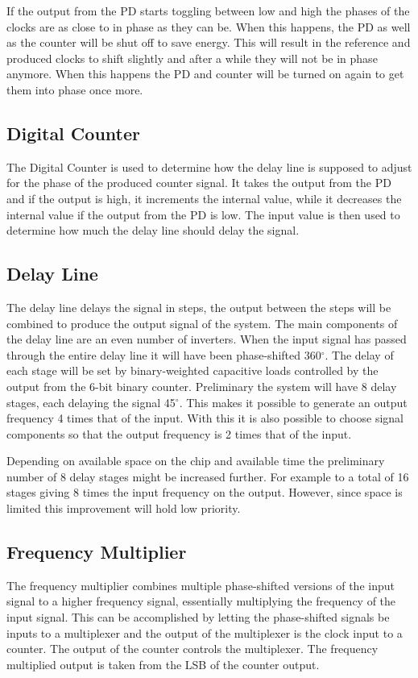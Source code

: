 \documentclass[a4paper,12pt]{article} \usepackage{graphicx}
\newcommand{\degree}{\ensuremath{^\circ}}
\begin{document}
If the output from the PD starts toggling between low and high the phases of 
the clocks are as close to in phase as they can be. When this happens, the PD 
as well as the counter will be shut off to save energy. This will result in 
the reference and produced clocks to shift slightly and after a while they will 
not be in phase anymore. When this happens the PD and counter will be turned 
on again to get them into phase once more.

\subsection{Digital Counter}
The Digital Counter is used to determine how the delay line is supposed to 
adjust for the phase of the produced counter signal. It takes the output from 
the PD and if the output is high, it increments the internal value, while it 
decreases the internal value if the output from the PD is low. The input value 
is then used to determine how much the delay line should delay the signal. 

\subsection{Delay Line}

The delay line delays the signal in steps, the output between the steps will be
combined to produce the output signal of the system. The main components
of the delay line are an even number of inverters.  When the input signal has
passed through the entire delay line it will have been phase-shifted 360\degree. 
The delay of each stage will be set by binary-weighted capacitive loads
controlled by the output from the 6-bit binary counter. Preliminary  the
system will have 8 delay stages, each delaying the signal 45\degree. This makes
it possible to generate an output frequency 4 times that of the input. With this
it is also possible to choose signal components so that the output frequency is
2 times that of the input.

Depending on available space on the chip and available time the preliminary
number of 8 delay stages might be increased further. For example to a total of
16 stages giving 8 times the input frequency on the output. However, since space
is limited this improvement will hold low priority.

\subsection{Frequency Multiplier}
The frequency multiplier combines multiple phase-shifted versions of the input
signal to a higher frequency signal, essentially multiplying the frequency of
the input signal. This can be accomplished by letting the phase-shifted
signals be inputs to a multiplexer and the output of the multiplexer is the 
clock input to a counter. The output of the counter controls the multiplexer.
The frequency multiplied output is taken from the LSB of the counter output.
\end{document}
